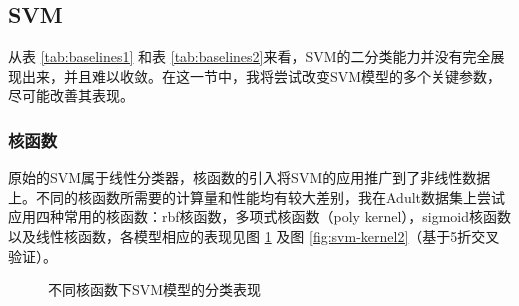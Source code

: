 \documentclass[12pt,a4paper]{article}
\theoremstyle{definition}
\begin{document}
\subsection{SVM}

从表 \ref{tab:baselines1} 和表 \ref{tab:baselines2}来看，SVM的二分类能力并没有完全展现出来，并且难以收敛。在这一节中，我将尝试改变SVM模型的多个关键参数，尽可能改善其表现。

\subsubsection{核函数}

原始的SVM属于线性分类器，核函数的引入将SVM的应用推广到了非线性数据上。不同的核函数所需要的计算量和性能均有较大差别，我在Adult数据集上尝试应用四种常用的核函数：rbf核函数，多项式核函数（poly kernel），sigmoid核函数以及线性核函数，各模型相应的表现见图 \ref{fig:svm-kernel1} 及图 \ref{fig:svm-kernel2}（基于5折交叉验证）。

\begin{figure}[H]
	\centering
	\caption{不同核函数下SVM模型的分类表现}
	\label{fig:svm-kernel1}
\end{figure}
\end{document}
